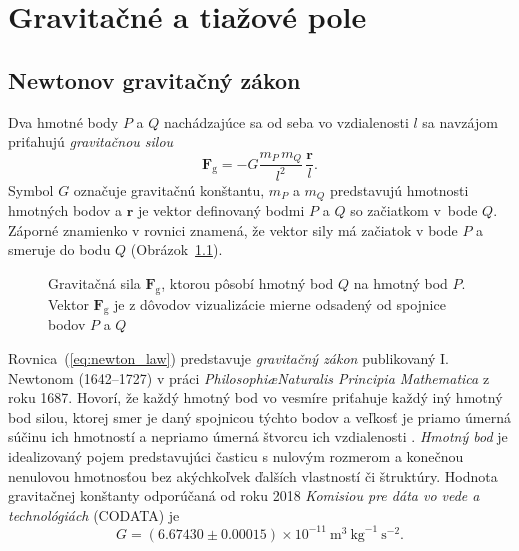 \documentclass[a4paper, 12pt]{book}
\newcommand{\gidx}{\mathrm g}
\let\vec\mathbf
\begin{document}

\chapter{Gravitačné a tiažové pole}
\label{sec:gravitational_and_gravity_field}






\section{Newtonov gravitačný zákon}
\label{sec:newton_law}

Dva hmotné body $P$ a $Q$ nachádzajúce sa od seba vo vzdialenosti $l$ sa 
navzájom priťahujú \emph{gravitačnou silou}
%
\begin{equation}
\label{eq:newton_law}
\vec F_\gidx = -G \frac{m_P \, m_Q}{l^2} \, \frac{\vec r}{l}{.}
\end{equation}
%
Symbol $G$ označuje gravitačnú konštantu, $m_P$ a $m_Q$ predstavujú hmotnosti 
hmotných bodov a $\vec r$ je vektor definovaný bodmi $P$ a $Q$ so začiatkom 
v~bode $Q$.  Záporné znamienko v rovnici znamená, že vektor sily má začiatok 
v bode $P$ a smeruje do bodu $Q$ (Obrázok~\ref{fig:newton_law}).

\begin{figure}[b]
\centering

\caption{Gravitačná sila $\vec F_\gidx$, ktorou pôsobí hmotný bod $Q$ na hmotný 
bod $P$.  Vektor $\vec F_\gidx$ je z dôvodov vizualizácie mierne odsadený od 
spojnice bodov $P$ a $Q$}
\label{fig:newton_law}
\end{figure}

Rovnica~(\ref{eq:newton_law}) predstavuje \emph{gravitačný zákon} 
publikovaný I. Newtonom (1642--1727) v práci \emph{Philosophi\ae Naturalis 
Principia Mathematica} z roku 1687.  Hovorí, že každý hmotný bod vo vesmíre 
priťahuje každý iný hmotný bod silou, ktorej smer je daný spojnicou týchto 
bodov a veľkosť je priamo úmerná súčinu ich hmotností a nepriamo úmerná štvorcu 
ich vzdialenosti \citep{Kellogg1967}.  \emph{Hmotný bod} je idealizovaný pojem 
predstavujúci časticu s nulovým rozmerom a konečnou nenulovou hmotnosťou bez 
akýchkoľvek ďalších vlastností či štruktúry.  Hodnota gravitačnej konštanty 
odporúčaná od roku 2018 \emph{Komisiou pre dáta vo vede a technológiách} 
(CODATA) je
%
\begin{equation}
G = (6.67430 \pm 0.00015) \times 10^{-11} \ \mathrm{m}^3 \ \mathrm{kg}^{-1} 
\ \mathrm{s}^{-2}{.}
\end{equation}
\end{document}
